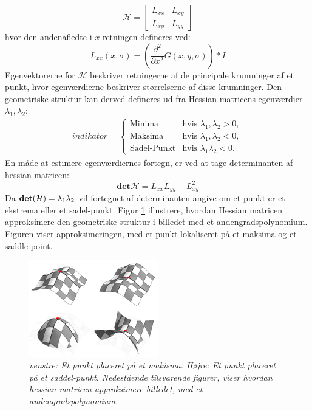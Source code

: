 \begin{equation}
\mathcal{H} = 
 \begin{bmatrix}
 	L_{xx} & L_{xy} \\
 	L_{xy} & L_{yy}
 \end{bmatrix}
 \label{hessianmatrixblob}
\end{equation}
hvor den andenafledte i $x$ retningen defineres ved:
\begin{equation}
L_{xx}(x, \sigma) = (\frac{\partial^2 }{\partial x^2 } G(x,y,\sigma)) * I
\label{lxx}
\end{equation}
Egenvektorerne for $\mathcal{H}$ beskriver retningerne af de principale krumninger af et punkt, hvor egenværdierne beskriver størrelserne af disse krumninger. Den geometriske struktur kan derved defineres ud fra Hessian matricens egenværdier $\lambda_1, \lambda_2$:
\begin{equation}
\begin{split}
indikator = 
\begin{cases}
\text{Minima} & \text{hvis } \lambda_1, \lambda_2 > 0, \\
\text{Maksima}& \text{hvis } \lambda_1, \lambda_2 < 0,  \\
\text{Sadel-Punkt} & \text{hvis } \lambda_1 \lambda_2 < 0.
\end{cases}
\end{split}
\label{maxsurp}
\end{equation}
En måde at estimere egenværdiernes fortegn, er ved at tage determinanten af hessian matricen:
\begin{equation}
\textbf{det}\mathcal{H} = L_{xx}L_{yy}-L_{xy}^2
\label{detofhessian}
\end{equation}
Da $\bold{det}(\mathcal{H})=\lambda_1 \lambda_2$ vil fortegnet af determinanten angive om et punkt er et ekstrema eller et sadel-punkt. Figur \ref{fig:makssad} illustrere, hvordan Hessian matricen approksimere den geometriske struktur i billedet med et andengradspolynomium. Figuren viser approksimeringen, med et punkt lokaliseret på et maksima og et saddle-point.
\begin{figure}[H]
    \centering
    \includegraphics[width=0.50\textwidth]{fig/41.png}
    \vspace{-0.5em}
    \begin{center}
    \caption{{\footnotesize \textit{venstre: Et punkt placeret på et makisma. Højre: Et punkt placeret på et saddel-punkt. Nedestående tilsvarende figurer, viser hvordan hessian matricen approksimere billedet, med et andengradspolynomium. 
}}}
    \label{fig:makssad}
     \end{center}
  \end{figure}
